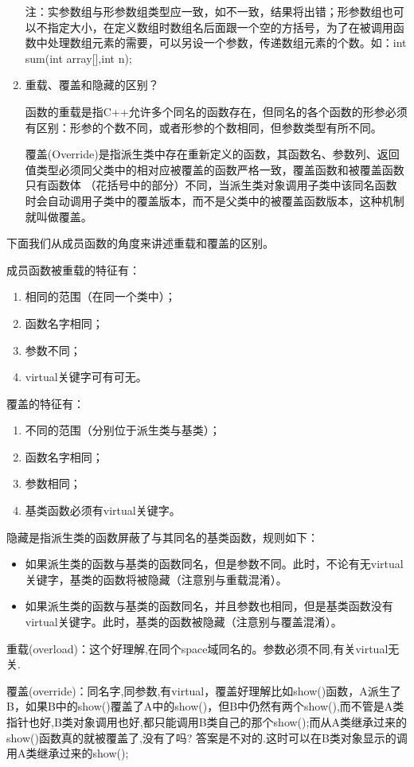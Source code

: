 \documentclass{article}
\begin{document}
\begin{CJK}{UTF8}{gbsn}
\begin{enumerate}
注：实参数组与形参数组类型应一致，如不一致，结果将出错；形参数组也可以不指定大小，在定义数组时数组名后面跟一个空的方括号，为了在被调用函数中处理数组元素的需要，可以另设一个参数，传递数组元素的个数。如：int sum(int array[],int n);  
\item 重载、覆盖和隐藏的区别？  

函数的重载是指C++允许多个同名的函数存在，但同名的各个函数的形参必须有区别：形参的个数不同，或者形参的个数相同，但参数类型有所不同。 

覆盖(Override)是指派生类中存在重新定义的函数，其函数名、参数列、返回值类型必须同父类中的相对应被覆盖的函数严格一致，覆盖函数和被覆盖函数只有函数体 （花括号中的部分）不同，当派生类对象调用子类中该同名函数时会自动调用子类中的覆盖版本，而不是父类中的被覆盖函数版本，这种机制就叫做覆盖。
\end{enumerate} 
下面我们从成员函数的角度来讲述重载和覆盖的区别。

成员函数被重载的特征有： 
\begin{enumerate}
\item 相同的范围（在同一个类中）；
\item 函数名字相同；
\item 参数不同；
\item virtual关键字可有可无。
\end{enumerate}

覆盖的特征有： 
\begin{enumerate} \itemsep=-3pt
\item 不同的范围（分别位于派生类与基类）；
\item 函数名字相同；
\item 参数相同；
\item 基类函数必须有virtual关键字。
\end{enumerate}

隐藏是指派生类的函数屏蔽了与其同名的基类函数，规则如下： 
\begin{itemize}
\itemsep=-3pt
\item 如果派生类的函数与基类的函数同名，但是参数不同。此时，不论有无virtual关键字，基类的函数将被隐藏（注意别与重载混淆）。
\item 如果派生类的函数与基类的函数同名，并且参数也相同，但是基类函数没有virtual关键字。此时，基类的函数被隐藏（注意别与覆盖混淆）。
\end{itemize}

重载(overload)：这个好理解,在同个space域同名的。参数必须不同,有关virtual无关.

覆盖(override)：同名字,同参数,有virtual，覆盖好理解比如show()函数，A派生了B，如果B中的show()覆盖了A中的show()，但B中仍然有两个show(),而不管是A类指针也好,B类对象调用也好,都只能调用B类自己的那个show();而从A类继承过来的show()函数真的就被覆盖了,没有了吗? 答案是不对的.这时可以在B类对象显示的调用A类继承过来的show();


\end{CJK}
\end{document}
